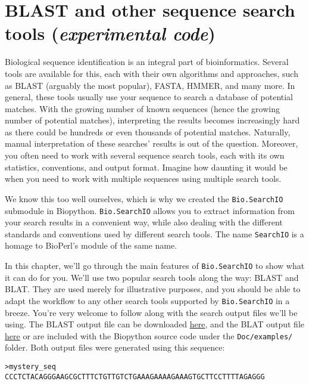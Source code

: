 \chapter{BLAST and other sequence search tools (\textit{experimental code})}
\label{chapter:searchio}

Biological sequence identification is an integral part of bioinformatics.
Several tools are available for this, each with their own algorithms and
approaches, such as BLAST (arguably the most popular), FASTA, HMMER, and many
more. In general, these tools usually use your sequence to search a database of
potential matches. With the growing number of known sequences (hence the
growing number of potential matches), interpreting the results becomes
increasingly hard as there could be hundreds or even thousands of potential
matches. Naturally, manual interpretation of these searches' results is out of
the question. Moreover, you often need to work with several sequence search
tools, each with its own statistics, conventions, and output format. Imagine how
daunting it would be when you need to work with multiple sequences using
multiple search tools.

We know this too well ourselves, which is why we created the \verb|Bio.SearchIO|
submodule in Biopython. \verb|Bio.SearchIO| allows you to extract information
from your search results in a convenient way, while also dealing with the
different standards and conventions used by different search tools.
The name \verb|SearchIO| is a homage to BioPerl's module of the same name.

In this chapter, we'll go through the main features of \verb|Bio.SearchIO| to
show what it can do for you. We'll use two popular search tools along the way:
BLAST and BLAT. They are used merely for illustrative purposes, and you should
be able to adapt the workflow to any other search tools supported by
\verb|Bio.SearchIO| in a breeze. You're very welcome to follow along with the
search output files we'll be using. The BLAST output file can be downloaded
\href{https://github.com/biopython/biopython/blob/master/Doc/examples/my_blast.xml}{here},
and the BLAT output file
\href{https://raw.githubusercontent.com/biopython/biopython/master/Doc/examples/my_blat.psl}{here}
or are included with the Biopython source code under the \verb|Doc/examples/|
folder. Both output files were generated using this sequence:

\begin{verbatim}
>mystery_seq
CCCTCTACAGGGAAGCGCTTTCTGTTGTCTGAAAGAAAAGAAAGTGCTTCCTTTTAGAGGG
\end{verbatim}

